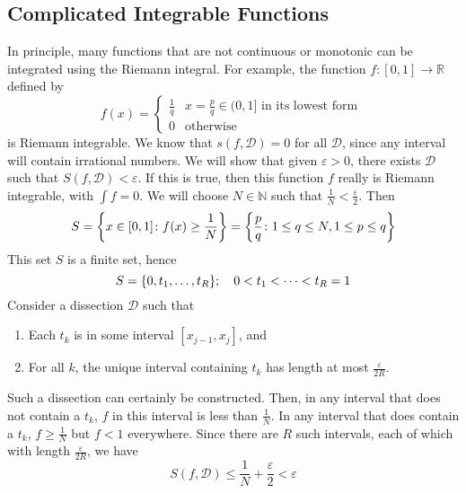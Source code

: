 \subsection{Complicated Integrable Functions}
In principle, many functions that are not continuous or monotonic can be integrated using the Riemann integral.
For example, the function \(f\colon [0, 1] \to \mathbb R\) defined by
\[
	f(x) = \begin{cases}
		\frac{1}{q} & x = \frac{p}{q} \in (0, 1] \text{ in its lowest form } \\
		0           & \text{otherwise}
	\end{cases}
\]
is Riemann integrable.
We know that \(s(f, \mathcal D) = 0\) for all \(\mathcal D\), since any interval will contain irrational numbers.
We will show that given \(\varepsilon > 0\), there exists \(\mathcal D\) such that \(S(f, \mathcal D) < \varepsilon\).
If this is true, then this function \(f\) really is Riemann integrable, with \(\int f = 0\).
We will choose \(N \in \mathbb N\) such that \(\frac{1}{N} < \frac{\varepsilon}{2}\).
Then
\[
	S = \qty{ x \in [0, 1] \colon f(x) \geq \frac{1}{N} } = \qty{ \frac{p}{q} \colon 1 \leq q \leq N, 1 \leq p \leq q }
\]
This set \(S\) is a finite set, hence
\[
	S = \qty{ 0, t_1, \dots, t_R };\quad 0 < t_1 < \dots < t_R = 1
\]
Consider a dissection \(\mathcal D\) such that
\begin{enumerate}[(1)]
	\item Each \(t_k\) is in some interval \([x_{j-1}, x_j]\), and
	\item For all \(k\), the unique interval containing \(t_k\) has length at most \(\frac{\varepsilon}{2R}\).
\end{enumerate}
Such a dissection can certainly be constructed.
Then, in any interval that does not contain a \(t_k\), \(f\) in this interval is less than \(\frac{1}{N}\).
In any interval that does contain a \(t_k\), \(f \geq \frac{1}{N}\) but \(f < 1\) everywhere.
Since there are \(R\) such intervals, each of which with length \(\frac{\varepsilon}{2R}\), we have
\[
	S(f, \mathcal D) \leq \frac{1}{N} + \frac{\varepsilon}{2} < \varepsilon
\]

